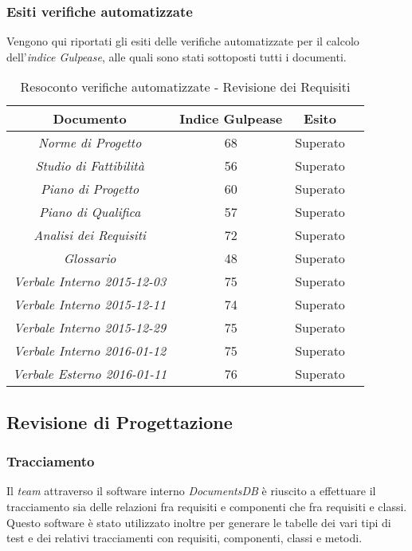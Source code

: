 \subsubsection{Esiti verifiche automatizzate}
Vengono qui riportati gli esiti delle verifiche automatizzate per il calcolo dell'\textit{indice Gulpease}, alle quali sono stati sottoposti tutti i documenti.
\begin{table}[h]
\begin{center}
\begin{tabular}{|c|c|c|c|}
\hline Documento & Indice Gulpease & Esito\\
\hline
\emph{Norme di Progetto} & 68 & Superato \\
\emph{Studio di Fattibilità} & 56 & Superato \\
\emph{Piano di Progetto} & 60 & Superato \\
\emph{Piano di Qualifica} & 57  & Superato \\
\emph{Analisi dei Requisiti} & 72 & Superato \\
\emph{Glossario} & 48 & Superato \\
\emph{Verbale Interno 2015-12-03} & 75 & Superato \\
\emph{Verbale Interno 2015-12-11} & 74 & Superato \\
\emph{Verbale Interno 2015-12-29} & 75 & Superato \\
\emph{Verbale Interno 2016-01-12} & 75 & Superato \\
\emph{Verbale Esterno 2016-01-11} & 76 & Superato \\
\hline
\end{tabular}
\caption{Resoconto verifiche automatizzate - Revisione dei Requisiti}
\end{center}
\end{table}

\subsection{Revisione di Progettazione}

\subsubsection{Tracciamento}
Il \textit{team} attraverso il software interno \textit{DocumentsDB} è riuscito a effettuare il tracciamento sia delle relazioni fra requisiti e componenti che fra requisiti e classi. Questo software è stato utilizzato inoltre per generare le tabelle dei vari tipi di test e dei relativi tracciamenti con requisiti, componenti, classi e metodi.

